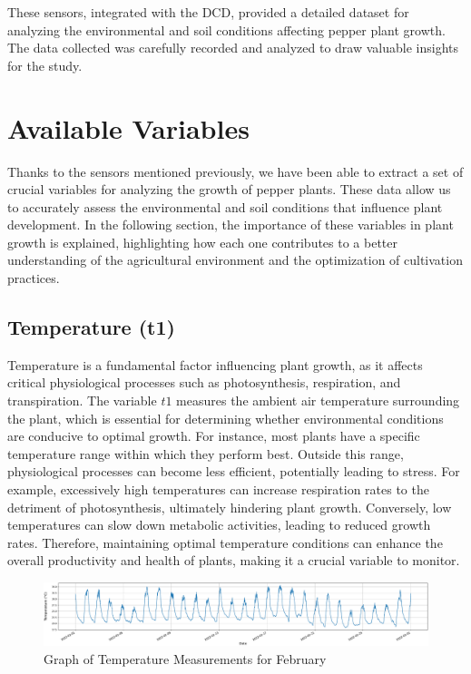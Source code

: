 These sensors, integrated with the DCD, provided a detailed dataset for analyzing the environmental and soil conditions affecting pepper plant growth. The data collected was carefully recorded and analyzed to draw valuable insights for the study.


\section{Available Variables}

Thanks to the sensors mentioned previously, we have been able to extract a set of crucial variables for analyzing the growth of pepper plants. These data allow us to accurately assess the environmental and soil conditions that influence plant development. In the following section, the importance of these variables in plant growth is explained, highlighting how each one contributes to a better understanding of the agricultural environment and the optimization of cultivation practices.

\subsection{Temperature (t1)}

Temperature is a fundamental factor influencing plant growth, as it affects critical physiological processes such as photosynthesis, respiration, and transpiration. The variable \( t1 \) measures the ambient air temperature surrounding the plant, which is essential for determining whether environmental conditions are conducive to optimal growth. For instance, most plants have a specific temperature range within which they perform best. Outside this range, physiological processes can become less efficient, potentially leading to stress. For example, excessively high temperatures can increase respiration rates to the detriment of photosynthesis, ultimately hindering plant growth. Conversely, low temperatures can slow down metabolic activities, leading to reduced growth rates. Therefore, maintaining optimal temperature conditions can enhance the overall productivity and health of plants, making it a crucial variable to monitor.

\begin{figure}[htbp]
    \centering
    \includegraphics[width=15 cm]{4_ChapterMaterials/figuras/train_data_Temperature.pdf}
    \caption{Graph of Temperature Measurements for February}
    \end{figure}

